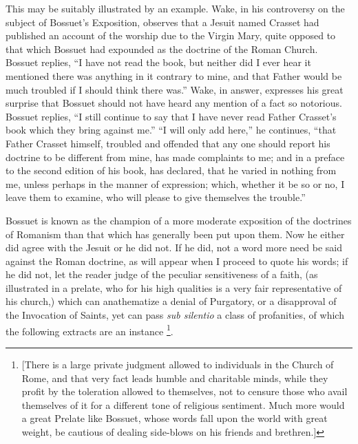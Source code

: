 This may be suitably illustrated by an example.
Wake, in his controversy on the subject of Bossuet's Exposition,
observes that a Jesuit named Crasset had published an account of the
worship due to the Virgin Mary, quite opposed to that which Bossuet
had expounded as the doctrine of the Roman Church. Bossuet replies, ``I
have not read the book, but neither did I ever hear it mentioned there
was anything in it contrary to mine, and that Father would be
much troubled if I should think there was.'' Wake, in answer, expresses
his great surprise that Bossuet should not have heard any mention of a
fact so notorious. Bossuet replies, ``I still continue to say that I
have never read Father Crasset's book which they bring against me.'' ``I
will only add here,'' he continues, ``that Father Crasset himself,
troubled and offended that any one should report his doctrine to be
different from mine, has made complaints to me; and in a preface to
the second edition of his book, has declared, that he varied in
nothing from me, unless perhaps in the manner of expression; which,
whether it be so or no, I leave them to examine, who will please to
give themselves the trouble.''

Bossuet is known as the champion of a more
moderate exposition of the doctrines of Romanism than that which has
generally been put upon them. Now he either did agree with the Jesuit
or he did not. If he did, not a word more need be said against the
Roman doctrine, as will appear when I proceed to quote his words; if
he did not, let the reader judge of the peculiar sensitiveness of a
faith, (as illustrated in a prelate, who for his high qualities is a
very fair representative of his church,) which can anathematize a
denial of Purgatory, or a disapproval of the Invocation of Saints, yet
can pass \emph{sub silentio} a class of profanities, of which the
following extracts are an instance \footnote{[There is a large private judgment allowed to individuals in the
Church of Rome, and that very fact leads humble and charitable minds,
while they profit by the toleration allowed to themselves, not to
censure those who avail themselves of it for a different tone of
religious sentiment. Much more would a great Prelate like Bossuet,
whose words fall upon the world with great weight, be cautious of
dealing side-blows on his friends and brethren.]}.

